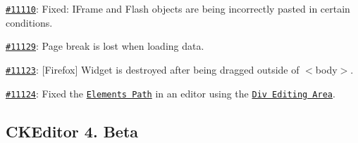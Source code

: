 \begin{DoxyItemize}
\item \href{http://dev.ckeditor.com/ticket/11110}{\tt \#11110}\-: Fixed\-: I\-Frame and Flash objects are being incorrectly pasted in certain conditions.
\item \href{http://dev.ckeditor.com/ticket/11129}{\tt \#11129}\-: Page break is lost when loading data.
\item \href{http://dev.ckeditor.com/ticket/11123}{\tt \#11123}\-: \mbox{[}Firefox\mbox{]} Widget is destroyed after being dragged outside of {\ttfamily $<$body$>$}.
\item \href{http://dev.ckeditor.com/ticket/11124}{\tt \#11124}\-: Fixed the \href{http://ckeditor.com/addon/elementspath}{\tt Elements Path} in an editor using the \href{http://ckeditor.com/addon/divarea}{\tt Div Editing Area}.
\end{DoxyItemize}

\subsection*{C\-K\-Editor 4. Beta}

